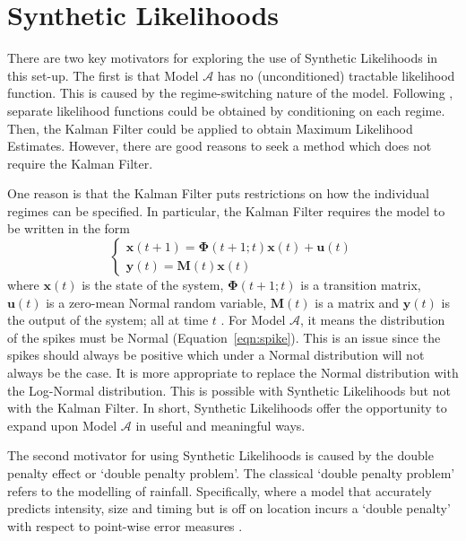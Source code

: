\section{Synthetic Likelihoods}
\label{sec:sl}
There are two key motivators for exploring the use of Synthetic Likelihoods in this set-up. The first is that Model $\mathcal{A}$ has no (unconditioned) tractable likelihood function. This is caused by the regime-switching nature of the model. Following \cite{huisman_mahieu_2003}, separate likelihood functions could be obtained by conditioning on each regime. Then, the Kalman Filter could be applied to obtain Maximum Likelihood Estimates. However, there are good reasons to seek a method which does not require the Kalman Filter.

One reason is that the Kalman Filter puts restrictions on how the individual regimes can be specified. In particular, the Kalman Filter requires the model to be written in the form
\begin{equation}
    \begin{cases}
        \pmb{x}(t + 1) = \pmb{\Phi}(t + 1 ;t)\pmb{x}(t) + \pmb{u}(t) \\
        \pmb{y}(t) = \pmb{M}(t)\pmb{x}(t)
    \end{cases}
\end{equation}
where $\pmb{x}(t)$ is the state of the system, $\pmb{\Phi}(t + 1 ;t)$ is a transition matrix, $\pmb{u}(t)$ is a zero-mean Normal random variable, $\pmb{M}(t)$ is a matrix and $\pmb{y}(t)$ is the output of the system; all at time $t$ \citep{kalman_1960}. For Model $\mathcal{A}$, it means the distribution of the spikes must be Normal (Equation~\ref{eqn:spike}). This is an issue since the spikes should always be positive which under a Normal distribution will not always be the case. It is more appropriate to replace the Normal distribution with the Log-Normal distribution. This is possible with Synthetic Likelihoods but not with the Kalman Filter. In short, Synthetic Likelihoods offer the opportunity to expand upon Model $\mathcal{A}$ in useful and meaningful ways.

The second motivator for using Synthetic Likelihoods is caused by the double penalty effect or `double penalty problem'. The classical `double penalty problem' refers to the modelling of rainfall. Specifically, where a model that accurately predicts intensity, size and timing but is off on location incurs a `double penalty' with respect to point-wise error measures \citep{keil_craig_2009}.

